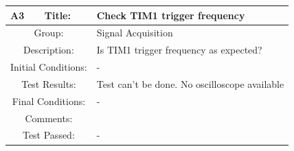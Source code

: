 \documentclass[12pt]{article}
\begin{document}
			\begin{table}[H]
		\begin{center}
			\begin{tabular}{| m{2cm}|m{2cm}|m{12cm}|}
				\hline 
				\bf A3&\bf Title:&\bf Check TIM1 trigger frequency\\ 
				\hline 
				\multicolumn{2}{|c|}{Group:}&Signal Acquisition\\ 
				\hline 
				\multicolumn{2}{|c|}{Description:}&Is TIM1 trigger frequency as expected?\\ 
				\hline 
				\multicolumn{2}{|c|}{Initial Conditions:}&-\\ 
				\hline 
				\multicolumn{2}{|c|}{Test Results:}&Test can't be done. No oscilloscope available\\ 
				\hline 
				\multicolumn{2}{|c|}{Final Conditions:}&-\\ 
				\hline 
				\multicolumn{2}{|c|}{Comments:}&\\ 
				\hline 
				\multicolumn{2}{|c|}{Test Passed:}&-\\ 
				\hline 
			\end{tabular} 
		\end{center}
	\end{table}	
	
\end{document}
